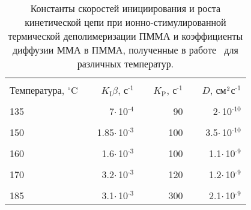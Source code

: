 \begin{table}[h]
	\begin{center}
	\caption{Константы скоростей инициирования и роста кинетической цепи при ионно-стимулированной термической деполимеризации ПММА и коэффициенты диффузии ММА в ПММА, полученные в работе~\cite{Fragala_3_diffusion} для различных температур.}
	\begin{tabular}{lc rc rc r}
		\hline \hline \\ [-1em]
		Температура, $^\circ$C & \hspace{4em} & $K_\mathrm{I} \beta$, с$^\text{-1}$ & \hspace{1em} & $K_\mathrm{P}$, с$^\text{-1}$ & \hspace{1em} & $D$, см$^\text{2}$с$^\text{-1}$
		\\ \hline \\ [-1em]
		135 & \hspace{4em} & 7\:$\cdot$\,10$^\text{-4}$ & \hspace{1em} & 90 & \hspace{1em} & 2\:$\cdot$\,10$^\text{-10}$
		\\ \\ [-1em]
		150 & \hspace{4em} & 1.85\:$\cdot$\,10$^\text{-3}$ & \hspace{1em} & 100 & \hspace{1em} & 3.5\:$\cdot$\,10$^\text{-10}$
		\\ \\ [-1em]
		160 & \hspace{4em} & 1.6\:$\cdot$\,10$^\text{-3}$ & \hspace{1em} & 100 & \hspace{1em} & 1.1\:$\cdot$\,10$^\text{-9}$
		\\ \\ [-1em]
		170 & \hspace{4em} & 3.2\:$\cdot$\,10$^\text{-3}$ & \hspace{1em} & 120 & \hspace{1em} & 1.2\:$\cdot$\,10$^\text{-9}$
		\\ \\ [-1em]
		185 & \hspace{4em} & 3.1\:$\cdot$\,10$^\text{-3}$ & \hspace{1em} & 300 & \hspace{1em} & 2.1\:$\cdot$\,10$^\text{-9}$
		\\ \hline \hline
	\end{tabular}
	\label{table:Ki_Kp_D}
	\end{center}
\end{table}

